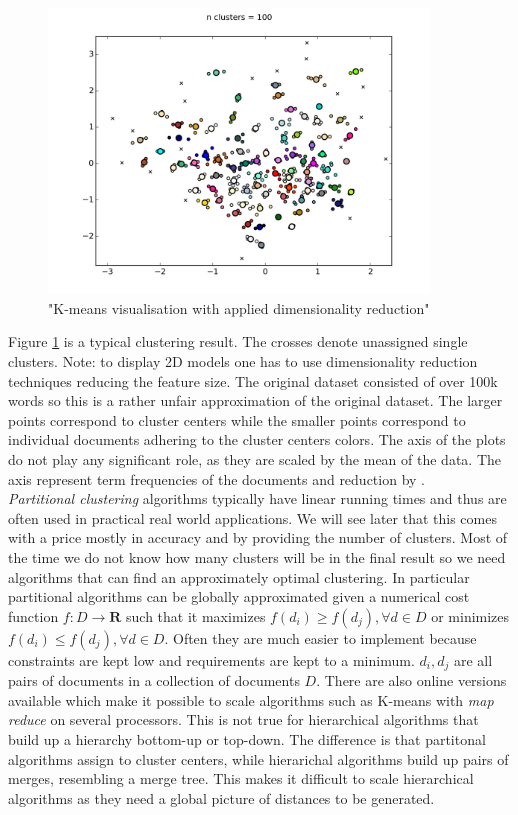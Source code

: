     \begin{figure}[h!]
      \centering
        \includegraphics[width=0.9\textwidth]{kmeans_clustering.png}
        \caption{"K-means visualisation with applied dimensionality reduction"}
        \label{kmeans_clustering}
    \end{figure}

    Figure \ref{kmeans_clustering} is a typical clustering result. The crosses denote unassigned single clusters. Note: to display 2D models one has to use dimensionality reduction techniques reducing the feature size. The original dataset consisted of over 100k words so this is a rather unfair approximation of the original dataset. The larger points correspond to cluster centers while the smaller points correspond to individual documents adhering to the cluster centers colors. The axis of the plots do not play any significant role, as they are scaled by the mean of the data. The axis represent term frequencies of the documents and reduction by \pca{}.\\

    \emph{Partitional clustering} algorithms typically have linear running times and thus are often used in practical real world applications. We will see later that this comes with a price mostly in accuracy and by providing the number of clusters. Most of the time we do not know how many clusters will be in the final result so we need algorithms that can find an approximately optimal clustering. In particular partitional algorithms can be globally approximated given a numerical cost function $f:D \to \mathbf{R}$ such that it maximizes $f(d_i) \geq f(d_j), \forall d \in D$  or minimizes $f(d_i) \leq f(d_j), \forall d \in D$. Often they are much easier to implement because constraints are kept low and requirements are kept to a minimum. $d_i,d_j$ are all pairs of documents in a collection of documents $D$. There are also online versions available which make it possible to scale algorithms such as K-means with \emph{map reduce} on several processors. This is not true for hierarchical algorithms that build up a hierarchy bottom-up or top-down. The difference is that partitonal algorithms assign to cluster centers, while hierarichal algorithms build up pairs of merges, resembling a merge tree. This makes it difficult to scale hierarchical algorithms as they need a global picture of distances to be generated.

